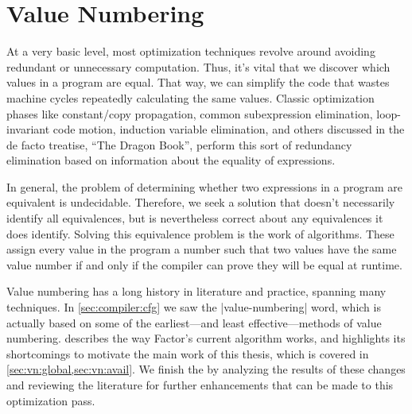 \section{Value Numbering}\label{sec:vn}

At a very basic level, most optimization techniques revolve around avoiding
redundant or unnecessary computation.  Thus, it's vital that we discover which
values in a program are equal.  That way, we can simplify the code that wastes
machine cycles repeatedly calculating the same values.  Classic optimization
phases like constant/copy propagation, common subexpression elimination,
loop-invariant code motion, induction variable elimination, and others
discussed in the de facto treatise, ``The Dragon Book'', perform
this sort of redundancy elimination based on information about the equality of
expressions.

In general, the problem of determining whether two expressions in a program are
equivalent is undecidable.  Therefore, we seek a  solution
that doesn't necessarily identify all equivalences, but is nevertheless correct
about any equivalences it does identify.  Solving this equivalence problem is
the work of  algorithms.  These assign every value in the
program a number such that two values have the same value number if and only if
the compiler can prove they will be equal at runtime.

Value numbering has a long history in literature and practice, spanning many
techniques.  In \cref{sec:compiler:cfg} we saw the \factor|value-numbering|
word, which is actually based on some of the earliest---and least
effective---methods of value numbering.   describes the way
Factor's current algorithm works, and highlights its shortcomings to motivate
the main work of this thesis, which is covered in
\cref{sec:vn:global,sec:vn:avail}.  We finish the  by
analyzing the results of these changes and reviewing the literature for further
enhancements that can be made to this optimization pass.

%
%
%
%

